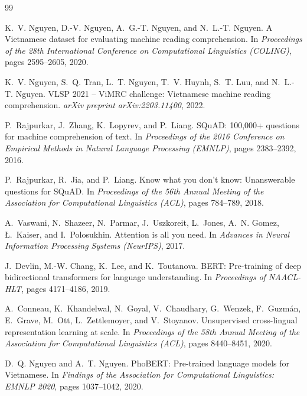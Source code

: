 {}
{\footnotesize
\begin{thebibliography}{99}\setlength{\itemsep}{1pt}\setlength{\parskip}{0pt}

K.~V. Nguyen, D.-V. Nguyen, A.~G.-T. Nguyen, and N.~L.-T. Nguyen.
\newblock A Vietnamese dataset for evaluating machine reading comprehension.
\newblock In \emph{Proceedings of the 28th International Conference on Computational Linguistics (COLING)}, pages 2595--2605, 2020.

K.~V. Nguyen, S.~Q. Tran, L.~T. Nguyen, T.~V. Huynh, S.~T. Luu, and N.~L.-T. Nguyen.
\newblock VLSP 2021 -- ViMRC challenge: Vietnamese machine reading comprehension.
\newblock \emph{arXiv preprint arXiv:2203.11400}, 2022.

P.~Rajpurkar, J.~Zhang, K.~Lopyrev, and P.~Liang.
\newblock SQuAD: 100,000+ questions for machine comprehension of text.
\newblock In \emph{Proceedings of the 2016 Conference on Empirical Methods in Natural Language Processing (EMNLP)}, pages 2383--2392, 2016.

P.~Rajpurkar, R.~Jia, and P.~Liang.
\newblock Know what you don't know: Unanswerable questions for SQuAD.
\newblock In \emph{Proceedings of the 56th Annual Meeting of the Association for Computational Linguistics (ACL)}, pages 784--789, 2018.

A.~Vaswani, N.~Shazeer, N.~Parmar, J.~Uszkoreit, L.~Jones, A.~N. Gomez, Ł.~Kaiser, and I.~Polosukhin.
\newblock Attention is all you need.
\newblock In \emph{Advances in Neural Information Processing Systems (NeurIPS)}, 2017.

J.~Devlin, M.-W. Chang, K.~Lee, and K.~Toutanova.
\newblock BERT: Pre-training of deep bidirectional transformers for language understanding.
\newblock In \emph{Proceedings of NAACL-HLT}, pages 4171--4186, 2019.

A.~Conneau, K.~Khandelwal, N.~Goyal, V.~Chaudhary, G.~Wenzek, F.~Guzmán, E.~Grave, M.~Ott, L.~Zettlemoyer, and V.~Stoyanov.
\newblock Unsupervised cross-lingual representation learning at scale.
\newblock In \emph{Proceedings of the 58th Annual Meeting of the Association for Computational Linguistics (ACL)}, pages 8440--8451, 2020.

D.~Q. Nguyen and A.~T. Nguyen.
\newblock PhoBERT: Pre-trained language models for Vietnamese.
\newblock In \emph{Findings of the Association for Computational Linguistics: EMNLP 2020}, pages 1037--1042, 2020.


\end{thebibliography}}
